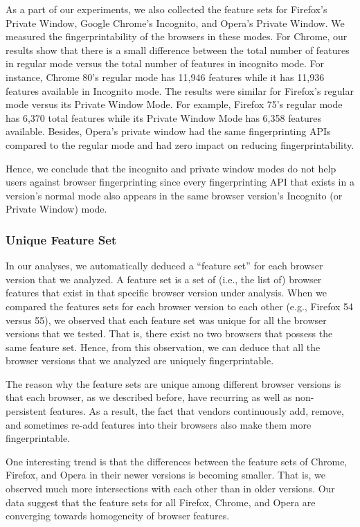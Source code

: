 As a part of our experiments, we also collected the feature sets for Firefox's Private Window,
Google Chrome's Incognito, and Opera's Private Window. We measured the
fingerprintability of the browsers in these modes. For Chrome, our results show
that there is a small difference between the total number of features in regular
mode versus the total number of features in incognito mode. For instance,
Chrome 80's regular mode has 11,946 features while it has 11,936 features
available in Incognito mode. The results were similar for Firefox's regular mode
versus its Private Window Mode. For example, Firefox 75's regular mode has 6,370
total features while its Private Window Mode has 6,358 features available. Besides,
Opera's private window had the same fingerprinting APIs compared to the regular mode
and had zero impact on reducing fingerprintability.

Hence, we conclude that the incognito and private window modes do not help
users against browser fingerprinting since every fingerprinting API that exists
in a version's normal mode also appears in the same browser version's Incognito
(or Private Window) mode.

\subsubsection{Unique Feature Set}

In our analyses, we automatically deduced a ``feature set'' for each
browser version that we analyzed. A feature set is a set of (i.e., the
list of) browser features that exist in that specific browser version
under analysis. When we compared the features sets for each browser
version to each other (e.g., Firefox 54 versus 55), we observed that
each feature set was unique for all the browser versions that we
tested. That is, there exist no two browsers that possess the same
feature set. Hence, from this observation, we can deduce that all the
browser versions that we analyzed are uniquely fingerprintable.

The reason why the feature sets are unique among different browser
versions is that each browser, as we described before, have recurring
as well as non-persistent features. As a result, the fact that vendors
continuously add, remove, and sometimes re-add features into their
browsers also make them more fingerprintable.


One interesting trend is that the differences between the feature sets
of Chrome, Firefox, and Opera in their newer versions is becoming smaller.
That is, we observed much more intersections with each other than in
older versions. Our data suggest that the feature sets for all
Firefox, Chrome, and Opera are converging towards homogeneity of browser
features.
